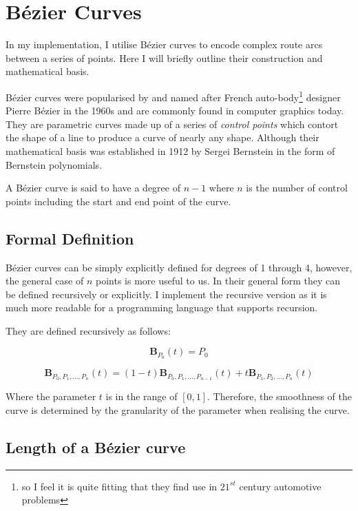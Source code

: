 \section{Bézier Curves}
\label{sec:back-bezier-curves}

In my implementation, I utilise Bézier curves to encode complex route arcs between a series of points. Here I will briefly outline their construction and mathematical basis.

Bézier curves were popularised by and named after French auto-body\footnote{so I feel it is quite fitting that they find use in $21^{st}$ century automotive problems} designer Pierre Bézier in the 1960s and are commonly found in computer graphics today. They are parametric curves made up of a series of \textit{control points} which contort the shape of a line to produce a curve of nearly any shape. Although their mathematical basis was established in 1912 by Sergei Bernstein in the form of Bernstein polynomials\cite{bernstein1912best}.

A Bézier curve is said to have a degree of $n-1$ where $n$ is the number of control points including the start and end point of the curve.

\subsection{Formal Definition}

Bézier curves can be simply explicitly defined for degrees of 1 through 4, however, the general case of $n$ points is more useful to us. In their general form they can be defined recursively or explicitly. I implement the recursive version as it is much more readable for a programming language that supports recursion.

They are defined recursively as follows:

\begin{equation}
    \textbf{B}_{P_0}(t) = P_0
\end{equation}

\begin{equation}
    \textbf{B}_{P_0,P_1,\ldots,P_n}(t) = (1-t)\textbf{B}_{P_0,P_1,\ldots,P_{n-1}}(t) + t\textbf{B}_{P_1,P_2,\ldots,P_n}(t)
\end{equation}

Where the parameter $t$ is in the range of $[0,1]$. Therefore, the smoothness of the curve is determined by the granularity of the parameter when realising the curve.

\subsection{Length of a Bézier curve}

